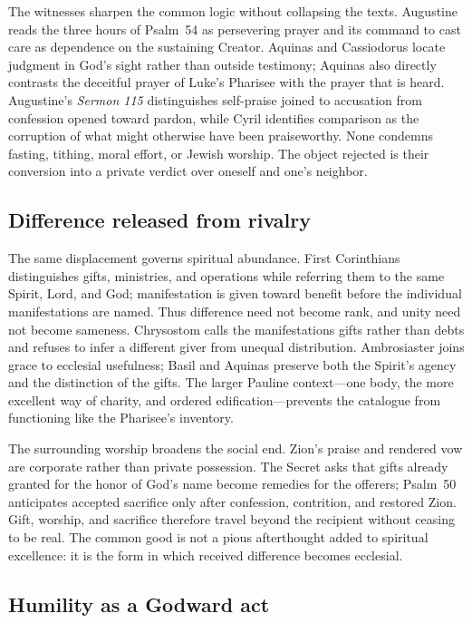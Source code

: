 The witnesses sharpen the common logic without collapsing the texts.
Augustine reads the three hours of Psalm~54 as persevering prayer and its
command to cast care as dependence on the sustaining Creator.  Aquinas and
Cassiodorus locate judgment in God's sight rather than outside testimony;
Aquinas also directly contrasts the deceitful prayer of Luke's Pharisee with
the prayer that is heard.  Augustine's \emph{Sermon 115} distinguishes
self-praise joined to accusation from confession opened toward pardon, while
Cyril identifies comparison as the corruption of what might otherwise have
been praiseworthy.  None condemns fasting, tithing, moral effort, or Jewish
worship.  The object rejected is their conversion into a private verdict over
oneself and one's neighbor.

\subsection*{Difference released from rivalry}

The same displacement governs spiritual abundance.  First Corinthians
distinguishes gifts, ministries, and operations while referring them to the
same Spirit, Lord, and God; manifestation is given toward benefit before the
individual manifestations are named.  Thus difference need not become rank,
and unity need not become sameness.  Chrysostom calls the manifestations
gifts rather than debts and refuses to infer a different giver from unequal
distribution.  Ambrosiaster joins grace to ecclesial usefulness; Basil and
Aquinas preserve both the Spirit's agency and the distinction of the gifts.
The larger Pauline context---one body, the more excellent way of charity, and
ordered edification---prevents the catalogue from functioning like the
Pharisee's inventory.

The surrounding worship broadens the social end.  Zion's praise and rendered
vow are corporate rather than private possession.  The Secret asks that gifts
already granted for the honor of God's name become remedies for the offerers;
Psalm~50 anticipates accepted sacrifice only after confession, contrition,
and restored Zion.  Gift, worship, and sacrifice therefore travel beyond the
recipient without ceasing to be real.  The common good is not a pious
afterthought added to spiritual excellence: it is the form in which received
difference becomes ecclesial.

\newpage

\subsection*{Humility as a Godward act}

